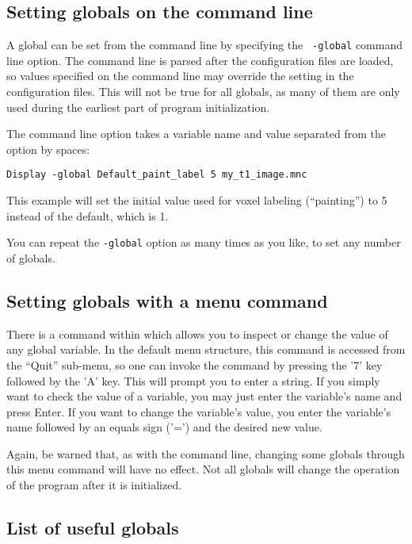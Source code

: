 \subsection{Setting globals on the command line}

A global can be set from the command line by specifying the {\tt
 -global} command line option. The command line is parsed after the
configuration files are loaded, so values specified on the command
line may override the setting in the configuration files. This will
not be true for all globals, as many of them are only used during the
earliest part of program initialization.

The command line option takes a variable name and value separated from
the option by spaces:
\begin{verbatim}
Display -global Default_paint_label 5 my_t1_image.mnc
\end{verbatim}
This example will set the initial value used for voxel labeling (``painting'') to 5 instead of the default, which is 1.

You can repeat the {\tt -global} option as many times as you like, to
set any number of globals.

\subsection{Setting globals with a menu command}

There is a command within \display{} which allows you to inspect or
change the value of any global variable. In the default menu
structure, this command is accessed from the ``Quit'' sub-menu, so one
can invoke the command by pressing the '7' key followed by the 'A'
key. This will prompt you to enter a string. If you simply want to check the value of a variable, you may just enter the variable's name and press Enter. If you want to change the variable's value, you enter the variable's name followed by an equals sign ('=') and the desired new value.

Again, be warned that, as with the command line, changing some globals
through this menu command will have no effect. Not all globals will change
the operation of the program after it is initialized.

\subsection{List of useful globals}

